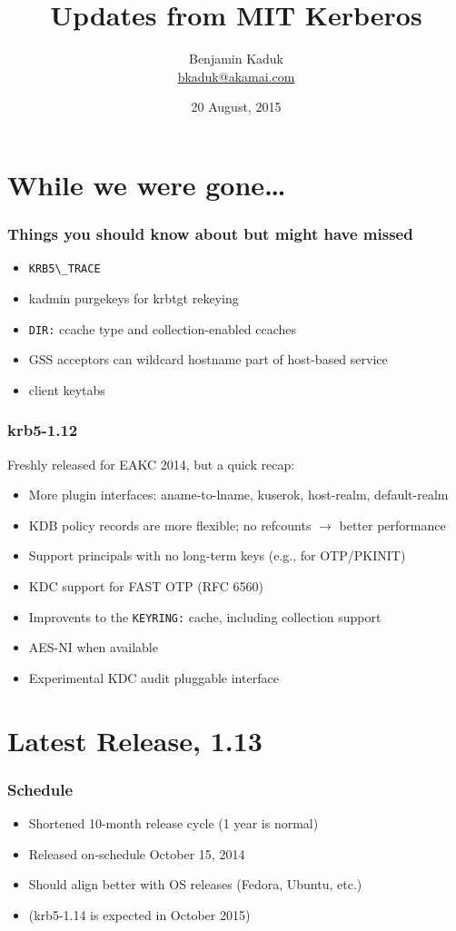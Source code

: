 \documentclass{beamer}
\title{Updates from MIT Kerberos}
\author{Benjamin Kaduk \\ \strikethrough{\url{kaduk@mit.edu}} \url{bkaduk@akamai.com}}
\date{20 August, 2015}
\begin{document}
\AtBeginSection[]
{
    \begin{frame}
	\tableofcontents[currentsection]
    \end{frame}
}

\frame{\titlepage}

\section{While we were gone\ldots{}}

\begin{frame}[fragile]
\frametitle{Things you should know about but might have missed}
\begin{itemize}
\item{\verb+KRB5\_TRACE+}
\item{kadmin purgekeys for krbtgt rekeying}
\item{\verb+DIR:+ ccache type and collection-enabled ccaches}
\item{GSS acceptors can wildcard hostname part of host-based service}
\item{client keytabs}
\end{itemize}
\end{frame}

\begin{frame}[fragile]
\frametitle{krb5-1.12}
Freshly released for EAKC 2014, but a quick recap:
\begin{itemize}
\item{More plugin interfaces: aname-to-lname, kuserok, host-realm,
	default-realm}
\item{KDB policy records are more flexible; no refcounts $\rightarrow$
	better performance}
\item{Support principals with no long-term keys (e.g., for OTP/PKINIT)}
\item{KDC support for FAST OTP (RFC 6560)}
\item{Improvents to the \verb+KEYRING:+ cache, including collection support}
\item{AES-NI when available}
\item{Experimental KDC audit pluggable interface}
\end{itemize}
\end{frame}

\section{Latest Release, 1.13}

\begin{frame}
\frametitle{Schedule}
\begin{itemize}
\item{Shortened 10-month release cycle (1 year is normal)}
\item{Released on-schedule October 15, 2014}
\item{Should align better with OS releases (Fedora, Ubuntu, etc.)}
\item{(krb5-1.14 is expected in October 2015)}
\end{itemize}
\end{frame}
\end{document}
